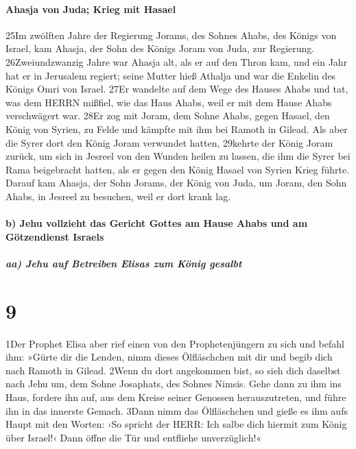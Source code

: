 \hypertarget{ahasja-von-juda-krieg-mit-hasael}{%
\paragraph{Ahasja von Juda; Krieg mit
Hasael}\label{ahasja-von-juda-krieg-mit-hasael}}

25Im zwölften Jahre der Regierung Jorams, des Sohnes Ahabs, des Königs
von Israel, kam Ahasja, der Sohn des Königs Joram von Juda, zur
Regierung. 26Zweiundzwanzig Jahre war Ahasja alt, als er auf den Thron
kam, und ein Jahr hat er in Jerusalem regiert; seine Mutter hieß Athalja
und war die Enkelin des Königs Omri von Israel. 27Er wandelte auf dem
Wege des Hauses Ahabs und tat, was dem HERRN mißfiel, wie das Haus
Ahabs, weil er mit dem Hause Ahabs verschwägert war. 28Er zog mit Joram,
dem Sohne Ahabs, gegen Hasael, den König von Syrien, zu Felde und
kämpfte mit ihm bei Ramoth in Gilead. Als aber die Syrer dort den König
Joram verwundet hatten, 29kehrte der König Joram zurück, um sich in
Jesreel von den Wunden heilen zu lassen, die ihm die Syrer bei Rama
beigebracht hatten, als er gegen den König Hasael von Syrien Krieg
führte. Darauf kam Ahasja, der Sohn Jorams, der König von Juda, um
Joram, den Sohn Ahabs, in Jesreel zu besuchen, weil er dort krank lag.

\hypertarget{b-jehu-vollzieht-das-gericht-gottes-am-hause-ahabs-und-am-guxf6tzendienst-israels}{%
\paragraph{b) Jehu vollzieht das Gericht Gottes am Hause Ahabs und am
Götzendienst
Israels}\label{b-jehu-vollzieht-das-gericht-gottes-am-hause-ahabs-und-am-guxf6tzendienst-israels}}

\hypertarget{aa-jehu-auf-betreiben-elisas-zum-kuxf6nig-gesalbt}{%
\subparagraph{aa) Jehu auf Betreiben Elisas zum König
gesalbt}\label{aa-jehu-auf-betreiben-elisas-zum-kuxf6nig-gesalbt}}

\hypertarget{section-8}{%
\section{9}\label{section-8}}

1Der Prophet Elisa aber rief einen von den Prophetenjüngern zu sich und
befahl ihm: »Gürte dir die Lenden, nimm dieses Ölfläschchen mit dir und
begib dich nach Ramoth in Gilead. 2Wenn du dort angekommen bist, so sieh
dich daselbst nach Jehu um, dem Sohne Josaphats, des Sohnes Nimsis. Gehe
dann zu ihm ins Haus, fordere ihn auf, aus dem Kreise seiner Genossen
herauszutreten, und führe ihn in das innerste Gemach. 3Dann nimm das
Ölfläschchen und gieße es ihm aufs Haupt mit den Worten: ›So spricht der
HERR: Ich salbe dich hiermit zum König über Israel!‹ Dann öffne die Tür
und entfliehe unverzüglich!«

